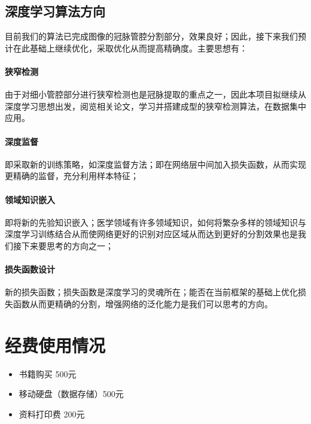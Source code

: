 \documentclass[lang=cn,11pt,a4paper,cite=numbers]{elegantpaper}
\begin{document}
\subsection{深度学习算法方向}

目前我们的算法已完成图像的冠脉管腔分割部分，效果良好；因此，接下来我们预计在此基础上继续优化，采取优化从而提高精确度。主要思想有：

\paragraph{狭窄检测}
由于对细小管腔部分进行狭窄检测也是冠脉提取的重点之一，因此本项目拟继续从深度学习思想出发，阅览相关论文，学习并搭建成型的狭窄检测算法，在数据集中应用。

\paragraph{深度监督}
即采取新的训练策略，如深度监督方法；即在网络层中间加入损失函数，从而实现更精确的监督，充分利用样本特征；

\paragraph{领域知识嵌入}
即将新的先验知识嵌入；医学领域有许多领域知识，如何将繁杂多样的领域知识与深度学习训练结合从而使网络更好的识别对应区域从而达到更好的分割效果也是我们接下来要思考的方向之一；

\paragraph{损失函数设计}
新的损失函数；损失函数是深度学习的灵魂所在；能否在当前框架的基础上优化损失函数从而更精确的分割，增强网络的泛化能力是我们可以思考的方向。

\section{经费使用情况}

\begin{itemize}
    \item 书籍购买 500元 
    \item 移动硬盘（数据存储）500元 
    \item 资料打印费 200元
\end{itemize}


\end{document}
